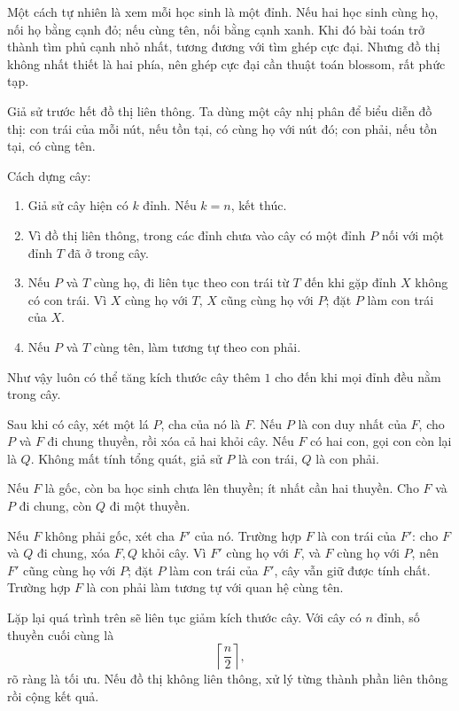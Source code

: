 \documentclass[11pt]{article}
\begin{document}
Một cách tự nhiên là xem mỗi học sinh là một đỉnh. Nếu hai học sinh cùng họ,
nối họ bằng cạnh đỏ; nếu cùng tên, nối bằng cạnh xanh. Khi đó bài toán trở
thành tìm phủ cạnh nhỏ nhất, tương đương với tìm ghép cực đại. Nhưng đồ thị
không nhất thiết là hai phía, nên ghép cực đại cần thuật toán blossom, rất
phức tạp.

Giả sử trước hết đồ thị liên thông. Ta dùng một cây nhị phân để biểu diễn đồ
thị: con trái của mỗi nút, nếu tồn tại, có cùng họ với nút đó; con phải, nếu
tồn tại, có cùng tên.

Cách dựng cây:
\begin{enumerate}
  \item Giả sử cây hiện có \(k\) đỉnh. Nếu \(k=n\), kết thúc.
  \item Vì đồ thị liên thông, trong các đỉnh chưa vào cây có một đỉnh \(P\)
  nối với một đỉnh \(T\) đã ở trong cây.
  \item Nếu \(P\) và \(T\) cùng họ, đi liên tục theo con trái từ \(T\) đến khi
  gặp đỉnh \(X\) không có con trái. Vì \(X\) cùng họ với \(T\), \(X\) cũng
  cùng họ với \(P\); đặt \(P\) làm con trái của \(X\).
  \item Nếu \(P\) và \(T\) cùng tên, làm tương tự theo con phải.
\end{enumerate}

Như vậy luôn có thể tăng kích thước cây thêm \(1\) cho đến khi mọi đỉnh đều
nằm trong cây.

Sau khi có cây, xét một lá \(P\), cha của nó là \(F\). Nếu \(P\) là con duy
nhất của \(F\), cho \(P\) và \(F\) đi chung thuyền, rồi xóa cả hai khỏi cây.
Nếu \(F\) có hai con, gọi con còn lại là \(Q\). Không mất tính tổng quát, giả
sử \(P\) là con trái, \(Q\) là con phải.

Nếu \(F\) là gốc, còn ba học sinh chưa lên thuyền; ít nhất cần hai thuyền.
Cho \(F\) và \(P\) đi chung, còn \(Q\) đi một thuyền.

Nếu \(F\) không phải gốc, xét cha \(F'\) của nó. Trường hợp \(F\) là con trái
của \(F'\): cho \(F\) và \(Q\) đi chung, xóa \(F,Q\) khỏi cây. Vì \(F'\) cùng
họ với \(F\), và \(F\) cùng họ với \(P\), nên \(F'\) cũng cùng họ với \(P\);
đặt \(P\) làm con trái của \(F'\), cây vẫn giữ được tính chất. Trường hợp
\(F\) là con phải làm tương tự với quan hệ cùng tên.

Lặp lại quá trình trên sẽ liên tục giảm kích thước cây. Với cây có \(n\) đỉnh,
số thuyền cuối cùng là
\[
  \left\lceil\frac n2\right\rceil,
\]
rõ ràng là tối ưu. Nếu đồ thị không liên thông, xử lý từng thành phần liên
thông rồi cộng kết quả.
\end{document}
